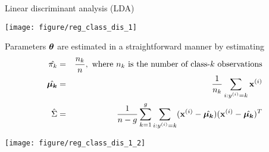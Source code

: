 \documentclass[11pt,compress,t,notes=noshow, xcolor=table]{beamer}
\begin{document}
\begin{vbframe}{Linear discriminant analysis (LDA)}
\begin{knitrout}
{\centering \texttt{[image: figure/reg\_class\_dis\_1]} 

}



\end{knitrout}


\framebreak
Parameters $\bm{\theta}$ are estimated in a straightforward manner by estimating
\begin{eqnarray*}
\hat{\pi_{k}} &=& \frac{n_k}{n},\text{ where $n_k$ is the number of class-$k$ observations} \\
\hat{\bm{\mu_k}} &=& \frac{1}{n_k}\sum_{i: y^{(i)} = k} \mathbf{x}^{(i)} \\
\hat{\Sigma} &=& \frac{1}{n - g} \sum\limits_{k=1}^g \sum_{i: y^{(i)} = k} (\mathbf{x}^{(i)} - \hat{\bm{\mu_k}}) (\mathbf{x}^{(i)} - \hat{\bm{\mu_k}}) ^T
\end{eqnarray*}

\begin{knitrout}\scriptsize
{}\color{fgcolor}

{\centering \texttt{[image: figure/reg\_class\_dis\_1\_2]} 

}



\end{knitrout}
\end{vbframe}
\end{document}

